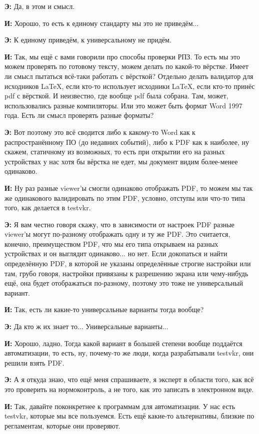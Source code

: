 \textbf{Э: }Да, в этом и смысл.

\textbf{И: }Хорошо, то есть к единому стандарту мы это не приведём...

\textbf{Э: }К единому приведём, к универсальному не придём.

\textbf{И: }Так, мы ещё с вами говорили про способы проверки РПЗ. То есть мы это можем проверять по готовому тексту, можем делать по какой-то вёрстке. Имеет ли смысл пытаться всё-таки работать с вёрсткой? Отдельно делать валидатор для исходников LaTeX, если кто-то использует исходники LaTeX, если кто-то принёс pdf с вёрсткой. И неизвестно, где вообще pdf была собрана. Там, может, использовались разные компиляторы. Или это может быть формат Word 1997 года. Есть ли смысл проверять разные форматы?

\textbf{Э: }Вот поэтому это всё сводится либо к какому-то Word как к распространённому ПО (до недавних событий), либо к PDF как к наиболее, ну скажем, статичному из возможных, то есть при открытии его на разных устройствах у нас хотя бы вёрстка не едет, мы документ видим более-менее одинаково.

\textbf{И: }Ну раз разные viewer'ы смогли одинаково отображать PDF, то можем мы так же одинакового валидировать по этим PDF, условно, отступы или что-то типа того, как делается в testvkr.

\textbf{Э: }Я вам честно говоря скажу, что в зависимости от настроек PDF разные viewer'ы могут по-разному отображать одну и ту же PDF. Это считается, конечно, преимуществом PDF, что мы его типа открываем на разных устройствах и он выглядит одинаково... но нет. Если докопаться и найти определённую PDF, в которой не указаны определённые строгие настройки или там, грубо говоря, настройки привязаны к разрешению экрана или чему-нибудь ещё, она будет отображаться по-разному, поэтому это тоже не универсальный вариант.

\textbf{И: }Так, есть ли какие-то универсальные варианты тогда вообще?

\textbf{Э: }Да кто ж их знает то... Универсальные варианты...

\textbf{И: }Хорошо, ладно. Тогда какой вариант в большей степени вообще поддаётся автоматизации, то есть, ну, почему-то же люди, когда разрабатывали testvkr, они решили взять PDF.

\textbf{Э: }А я откуда знаю, что ещё меня спрашиваете, я эксперт в области того, как всё это проверить на нормоконтроль, а не того, как это записать в электронном виде.

\textbf{И: }Так, давайте поконкретнее к программам для автоматизации. У нас есть testvkr, которые мы все пользуемся. Есть ещё какие-то альтернативы, близкие по регламентам, которые они проверяют.

